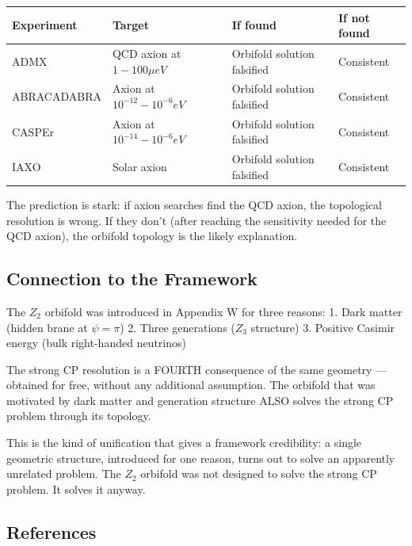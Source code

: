 \documentclass[aps,prd,preprint,superscriptaddress,longbibliography,floatfix]{revtex4-2}
\theoremstyle{remark}
\begin{document}
\begin{table}[H]
\begin{ruledtabular}
\begin{tabular}{p{3.8cm}p{3.8cm}p{3.8cm}p{3.8cm}}
Experiment & Target & If found & If not found \\
\hline
ADMX & QCD axion at $1-100 \mu eV$ & Orbifold solution falsified & Consistent \\
ABRACADABRA & Axion at $10^{-12}-10^{-6} eV$ & Orbifold solution falsified & Consistent \\
CASPEr & Axion at $10^{-14}-10^{-6} eV$ & Orbifold solution falsified & Consistent \\
IAXO & Solar axion & Orbifold solution falsified & Consistent \\
\end{tabular}
\end{ruledtabular}
\end{table}

The prediction is stark: if axion searches find the QCD axion, the topological resolution is wrong. If they don't (after reaching the sensitivity needed for the QCD axion), the orbifold topology is the likely explanation.


\subsection{Connection to the Framework}

The $Z_{2}$ orbifold was introduced in Appendix W for three reasons: 1. Dark matter (hidden brane at $\psi = \pi$) 2. Three generations ($Z_{3}$ structure) 3. Positive Casimir energy (bulk right-handed neutrinos)

The strong CP resolution is a FOURTH consequence of the same geometry --- obtained for free, without any additional assumption. The orbifold that was motivated by dark matter and generation structure ALSO solves the strong CP problem through its topology.

This is the kind of unification that gives a framework credibility: a single geometric structure, introduced for one reason, turns out to solve an apparently unrelated problem. The $Z_{2}$ orbifold was not designed to solve the strong CP problem. It solves it anyway.


\subsection{References}
\end{document}
